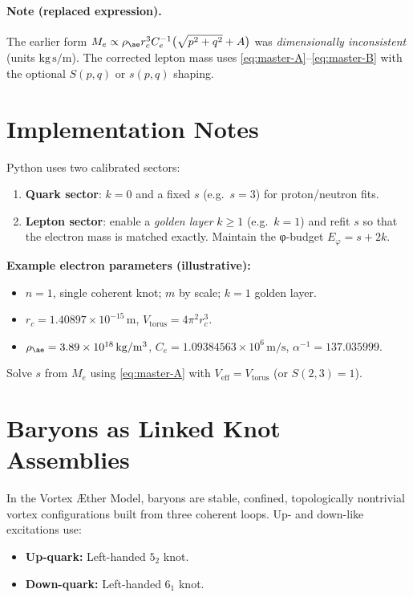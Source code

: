 \documentclass[12pt]{article}
\begin{document}
  \paragraph{Note (replaced expression).}
  The earlier form
  \(
  M_e \propto \rho_{\ae} r_c^3 C_e^{-1}\big(\sqrt{p^2+q^2}+A\big)
  \)
  was \emph{dimensionally inconsistent} (units \(\mathrm{kg\,s/m}\)). The corrected lepton mass uses \eqref{eq:master-A}–\eqref{eq:master-B} with the optional \(S(p,q)\) or \(s(p,q)\) shaping.

  \section{Implementation Notes}
  Python uses two calibrated sectors:
  \begin{enumerate}
      \item \textbf{Quark sector}: \(k=0\) and a fixed \(s\) (e.g.\ \(s=3\)) for proton/neutron fits.
      \item \textbf{Lepton sector}: enable a \emph{golden layer} \(k\ge1\) (e.g.\ \(k=1\)) and refit \(s\) so that the electron mass is matched exactly. Maintain the φ-budget \(E_\varphi=s+2k\).
  \end{enumerate}

  \noindent
  \textbf{Example electron parameters (illustrative):}
  \begin{itemize}
      \item \(n=1\), single coherent knot; \(m\) by scale; \(k=1\) golden layer.
      \item \(r_c = 1.40897\times 10^{-15}\,\mathrm{m}\), \(V_{\text{torus}}=4\pi^2 r_c^3\).
      \item \(\rho_{\ae}=3.89\times10^{18}\,\mathrm{kg/m^3}\), \(C_e=1.09384563\times10^6\,\mathrm{m/s}\), \(\alpha^{-1}=137.035999\).
  \end{itemize}
  Solve \(s\) from \(M_e\) using \eqref{eq:master-A} with \(V_{\text{eff}}=V_{\text{torus}}\) (or \(S(2,3)=1\)).

  \section{Baryons as Linked Knot Assemblies}
  In the Vortex \AE ther Model, baryons are stable, confined, topologically nontrivial vortex configurations built from three coherent loops. Up- and down-like excitations use:
  \begin{itemize}
      \item \textbf{Up-quark:} Left-handed \(5_2\) knot.
      \item \textbf{Down-quark:} Left-handed \(6_1\) knot.
  \end{itemize}
\end{document}
